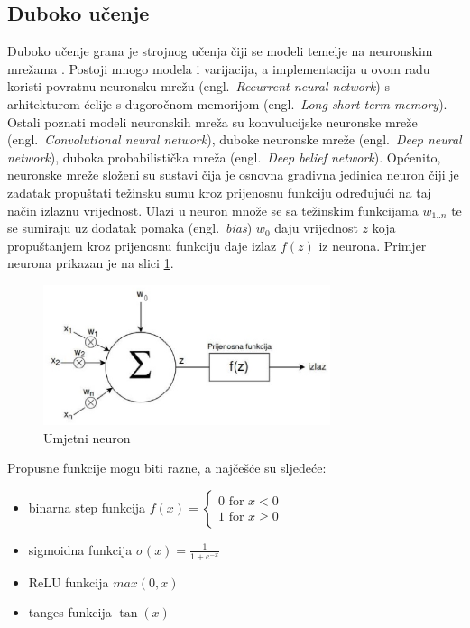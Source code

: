 \documentclass[times, utf8, zavrsni]{fer}
\begin{document}
\subsection{Duboko učenje}

Duboko učenje grana je strojnog učenja čiji se modeli temelje na neuronskim mrežama \citep{cupic}. Postoji mnogo modela i varijacija, a implementacija u ovom radu koristi povratnu neuronsku mrežu (engl.~\emph{Recurrent neural network}) s arhitekturom ćelije s dugoročnom memorijom (engl.~\emph{Long short-term memory}). Ostali poznati modeli neuronskih mreža su konvulucijske neuronske mreže (engl.~\emph{Convolutional neural network}), duboke neuronske mreže (engl.~\emph{Deep neural network}), duboka probabilistička mreža (engl.~\emph{Deep belief network}). Općenito, neuronske mreže složeni su sustavi čija je osnovna gradivna jedinica neuron čiji je zadatak propuštati težinsku sumu kroz prijenosnu funkciju određujući na taj način izlaznu vrijednost. Ulazi u neuron množe se sa težinskim funkcijama $w_{1..n}$ te se sumiraju uz dodatak pomaka (engl.~\emph{bias}) $w_0$ daju vrijednost $z$ koja propuštanjem kroz prijenosnu funkciju daje izlaz $f(z)$ iz neurona. Primjer neurona prikazan je na slici \ref{neuron}.  

\begin{figure}[h]
\centering
\includegraphics[width=0.75\textwidth]{neuron}
\caption{Umjetni neuron}
\label{neuron}
\end{figure}

Propusne funkcije mogu biti razne, a najčešće su sljedeće:
\begin{itemize}
\item binarna step funkcija $f(x)=\left\{\begin{array}{l}0 \text { for } x<0 \\1 \text { for } x \geq 0\end{array}\right.$
\item sigmoidna funkcija $\sigma(x)=\frac{1}{1+e^{-x}}$
\item ReLU funkcija $max(0,x)$
\item tanges funkcija $\tan(x)$
\end{itemize}
\end{document}
